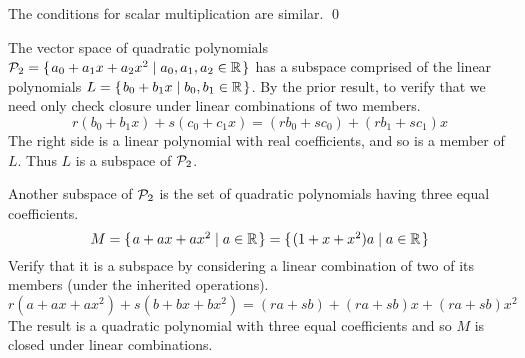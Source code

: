\documentclass[10pt,t]{beamer}
\begin{document}
\begin{frame}
\lm[th:SubspIffClosed]

\pause\bigskip
{}
\end{frame}\begin{frame}
\pf[th:SubspIffClosed]

\pause
The conditions for scalar multiplication are similar.
\qed
\end{frame}




\begin{frame}
\ex
The vector space of quadratic polynomials
$\mathcal{P}_2=\mbox{$\{\hspace{0.1em}a_0+a_1x+a_2x^2\mid a_0,a_1,a_2\in\mathbb{R}\hspace{0.1em}\}$}$ has a subspace
comprised of the linear polynomials
$L=\mbox{$\{\hspace{0.1em}b_0+b_1x\mid b_0,b_1\in\mathbb{R}\hspace{0.1em}\}$}$.
By the prior result, to verify that we need only check 
closure under linear combinations of two members.
\begin{equation*}
  r(b_0+b_1x)+s(c_0+c_1x)=(rb_0+sc_0)+(rb_1+sc_1)x
\end{equation*}
The right side is a linear polynomial with real coefficients, and so is a 
member of $L$.
Thus $L$ is a subspace of $\mathcal{P}_2$.

\pause
\ex
Another subspace of $\mathcal{P}_2$ is the set of quadratic polynomials
having three equal coefficients.
\begin{equation*}
  M=\mbox{$\{\hspace{0.1em}a+ax+ax^2\mid a\in\mathbb{R}\hspace{0.1em}\}$}
   =\mbox{$\{\hspace{0.1em}(1+x+x^2)a\mid a\in\mathbb{R}\hspace{0.1em}\}$}
\end{equation*}
Verify that it is a subspace by
considering a linear combination of two of its members
(under the inherited operations).
\begin{equation*}
  r(a+ax+ax^2)+s(b+bx+bx^2)
  =(ra+sb)+(ra+sb)x+(ra+sb)x^2
\end{equation*}
The result is a quadratic polynomial with three equal coefficients  
and so $M$ is closed under linear combinations.
\end{frame}
\end{document}
